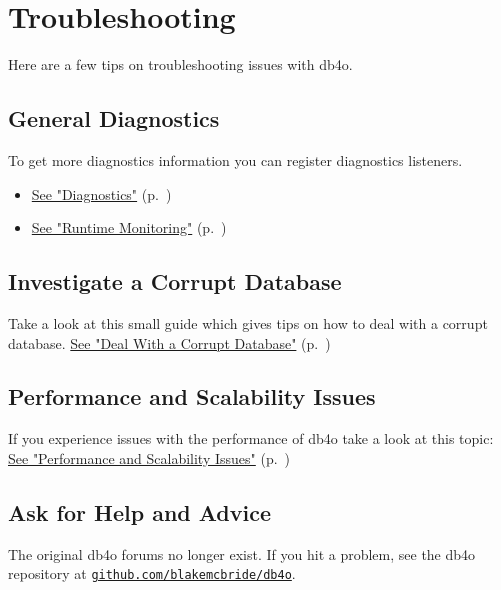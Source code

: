 
\chapter{Troubleshooting}
\label{ref:trouble-shooting}

Here are a few tips on troubleshooting issues with db4o.

\section{General Diagnostics}
\label{ref:trouble-shooting:general}

To get more diagnostics information you can register diagnostics listeners.

\begin{itemize}
\item \hyperref[ref:advanced-topics-diagnostics]{See "Diagnostics"} (p.~\pageref{ref:advanced-topics-diagnostics})
\item \hyperref[ref:advanced-topics-runtime-statistics]{See "Runtime Monitoring"} (p.~\pageref{ref:advanced-topics-runtime-statistics})
\end{itemize}

\section*{Investigate a Corrupt Database}

Take a look at this small guide which gives tips on how to deal with a corrupt database. \hyperref[ref:troubleshoot-corrupt-db]{See "Deal With a Corrupt Database"} (p.~\pageref{ref:troubleshoot-corrupt-db})

\section*{Performance and Scalability Issues}

If you experience issues with the performance of db4o take a look at this topic: \hyperref[ref:troubleshoot-speed-issues-html]{See "Performance and Scalability Issues"} (p.~\pageref{ref:troubleshoot-speed-issues-html})

\section{Ask for Help and Advice}
\label{ref:trouble-shooting:ask}

The original db4o forums no longer exist. If you hit a problem, see the db4o repository at \href{https://github.com/blakemcbride/db4o}{\nolinkurl{github.com/blakemcbride/db4o}}.

